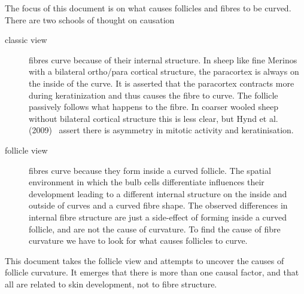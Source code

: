 \documentclass{article}
\begin{document}
The focus of this document is on what causes follicles and fibres to be curved. There are two schools of thought on causation
\begin{description}
\item[classic view] fibres curve because of their internal structure. In sheep like fine Merinos with a bilateral ortho/para cortical structure, the paracortex is always on the inside of the curve. It is asserted that the paracortex contracts more during keratinization and thus causes the fibre to curve. The follicle passively follows what happens to the fibre. In coarser wooled sheep without bilateral cortical structure this is less clear, but Hynd et al. (2009)~\cite{hynd-2009} assert there is asymmetry in mitotic activity and keratinisation.
\item[follicle view] fibres curve because they form inside a curved follicle. The spatial environment in which the bulb cells differentiate influences their development leading to a different internal structure on the inside and outside of curves and a curved fibre shape.  The observed differences in internal fibre structure are just a side-effect of forming inside a curved follicle, and are not the cause of curvature. To find the cause of fibre curvature we have to look for what causes follicles to curve.  
\end{description}

This document takes the follicle view and attempts to uncover the causes of follicle curvature. It emerges that there is more than one causal factor, and that all are related to skin development, not to fibre structure.
\end{document}
